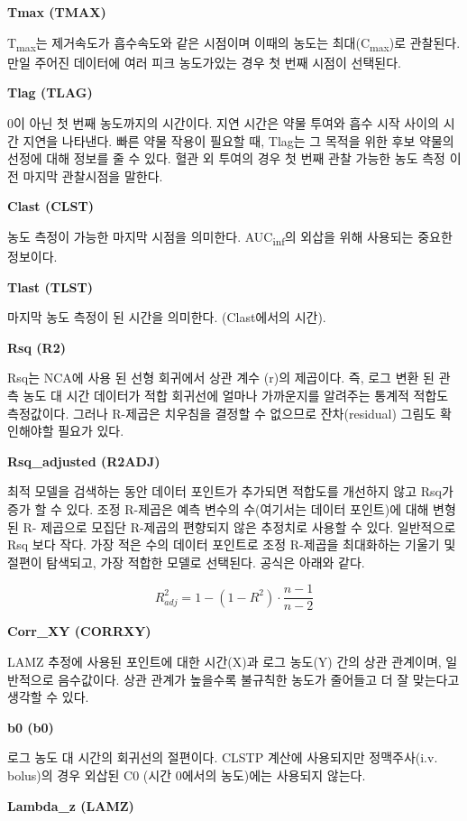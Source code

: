 \documentclass[
  11pt,
  krantz2, a4paper, twoside]{krantz}
\theoremstyle{definition}
\theoremstyle{definition}
\theoremstyle{definition}
\theoremstyle{definition}
\theoremstyle{remark}
\begin{document}
\textbf{Tmax (TMAX)}

T\textsubscript{max}는 제거속도가 흡수속도와 같은 시점이며 이때의 농도는 최대(C\textsubscript{max})로 관찰된다. 만일 주어진 데이터에 여러 피크 농도가있는 경우 첫 번째 시점이 선택된다.

\textbf{Tlag (TLAG)}

0이 아닌 첫 번째 농도까지의 시간이다. 지연 시간은 약물 투여와 흡수 시작 사이의 시간 지연을 나타낸다. 빠른 약물 작용이 필요할 때, Tlag는 그 목적을 위한 후보 약물의 선정에 대해 정보를 줄 수 있다. 혈관 외 투여의 경우 첫 번째 관찰 가능한 농도 측정 이전 마지막 관찰시점을 말한다.

\textbf{Clast (CLST)}

농도 측정이 가능한 마지막 시점을 의미한다. AUC\textsubscript{inf}의 외삽을 위해 사용되는 중요한 정보이다.

\textbf{Tlast (TLST)}

마지막 농도 측정이 된 시간을 의미한다. (Clast에서의 시간).

\textbf{Rsq (R2)}

Rsq는 NCA에 사용 된 선형 회귀에서 상관 계수 (r)의 제곱이다. 즉, 로그 변환 된 관측 농도 대 시간 데이터가 적합 회귀선에 얼마나 가까운지를 알려주는 통계적 적합도 측정값이다. 그러나 R-제곱은 치우침을 결정할 수 없으므로 잔차(residual) 그림도 확인해야할 필요가 있다.

\textbf{Rsq\_adjusted (R2ADJ)}

최적 모델을 검색하는 동안 데이터 포인트가 추가되면 적합도를 개선하지 않고 Rsq가 증가 할 수 있다. 조정 R-제곱은 예측 변수의 수(여기서는 데이터 포인트)에 대해 변형된 R- 제곱으로 모집단 R-제곱의 편향되지 않은 추정치로 사용할 수 있다. 일반적으로 Rsq 보다 작다. 가장 적은 수의 데이터 포인트로 조정 R-제곱을 최대화하는 기울기 및 절편이 탐색되고, 가장 적합한 모델로 선택된다. 공식은 아래와 같다.

\[R_{adj}^{2} = 1 - (1 - R^{2}) \cdot \frac{n - 1}{n - 2}\]

\textbf{Corr\_XY (CORRXY)}

LAMZ 추정에 사용된 포인트에 대한 시간(X)과 로그 농도(Y) 간의 상관 관계이며, 일반적으로 음수값이다. 상관 관계가 높을수록 불규칙한 농도가 줄어들고 더 잘 맞는다고 생각할 수 있다.

\textbf{b0 (b0)}

로그 농도 대 시간의 회귀선의 절편이다. CLSTP 계산에 사용되지만 정맥주사(i.v. bolus)의 경우 외삽된 C0 (시간 0에서의 농도)에는 사용되지 않는다.

\textbf{Lambda\_z (LAMZ)}
\end{document}
